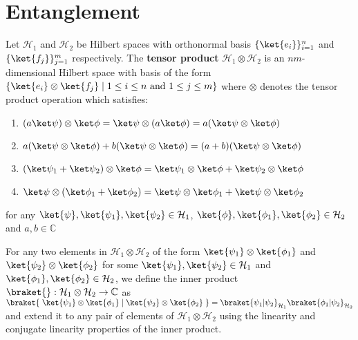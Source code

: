 \pagebreak
\section{Entanglement}

\begin{comment}
x notation for tensor product of vectors
x Simple notation
x properties of tensor product of vectors
* orthonormal basis for tensor product space
* Inner product defined on space of tensor products of vectors
* Definition of tensor product of spaces -- Hilbert space
* Notation for tensor product of spaces
* Tensor product multiplication rules
* Principle of Entanglement
* Proof that most states are entangled
\end{comment}

\begin{defn}
    Let $\mathcal{H}_1$ and $\mathcal{H}_2$ be Hilbert spaces with orthonormal basis $\{ \ket{e_i} \}_{i=1}^n$ and $\{ \ket{f_j} \}_{j=1}^m$ respectively.
    The \textbf{tensor product} $\mathcal{H}_1 \otimes \mathcal{H}_2$  is an $nm$-dimensional Hilbert space with basis of the form $\{ \ket{e_i} \otimes \ket{f_j} \; | \; 1 \leq i \leq n \text{ and } 1 \leq j \leq m \}$ where $\otimes$ denotes the tensor product operation which satisfies:
    \begin{enumerate}
        \item $(a \ket\psi) \otimes \ket\phi = \ket\psi \otimes (a \ket\phi) = a (\ket\psi \otimes \ket\phi)$
        \item $a (\ket\psi \otimes \ket\phi) + b (\ket\psi \otimes \ket\phi) = (a + b) (\ket\psi \otimes \ket\phi)$
        \item $(\ket\psi_1 + \ket\psi_2) \otimes \ket\phi = \ket\psi_1 \otimes \ket\phi + \ket\psi_2 \otimes \ket\phi$
        \item $\ket\psi \otimes (\ket\phi_1 + \ket\phi_2) = \ket\psi \otimes \ket\phi_1 + \ket\psi \otimes \ket\phi_2$
    \end{enumerate}
    for any $\ket{\psi},\ket{\psi_1},\ket{\psi_2} \in \mathcal{H}_1$, $\ket{\phi}, \ket{\phi_1}, \ket{\phi_2} \in \mathcal{H}_2$ and $a, b \in \mathbb{C}$

    For any two elements in $\mathcal{H}_1 \otimes \mathcal{H}_2$ of the form $\ket{\psi_1} \otimes \ket{\phi_1}$ and $\ket{\psi_2} \otimes \ket{\phi_2}$ for some $\ket{\psi_1}, \ket{\psi_2} \in \mathcal{H}_1$ and $\ket{\phi_1}, \ket{\phi_2} \in \mathcal{H}_2$, we define the inner product $\braket{} : \mathcal{H}_1 \otimes \mathcal{H}_2 \to \mathbb{C}$ as $\braket{\; \ket{\psi_1} \otimes \ket{\phi_1} \; | \; \ket{\psi_2} \otimes \ket{\phi_2} \;} = \braket{\psi_1|\psi_2}_{\mathcal{H}_1}\braket{\phi_1|\psi_2}_{\mathcal{H}_2}$ and extend it to any pair of elements of $\mathcal{H}_1 \otimes \mathcal{H}_2$ using the linearity and conjugate linearity properties of the inner product.
\end{defn}

